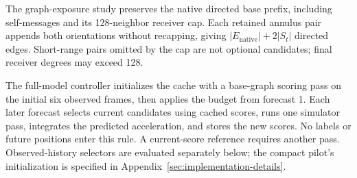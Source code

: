 The graph-exposure study preserves the native directed base prefix, including self-messages and its 128-neighbor receiver cap. Each retained annulus pair appends both orientations without recapping, giving $|E_{\mathrm{native}}|+2|S_t|$ directed edges. Short-range pairs omitted by the cap are not optional candidates; final receiver degrees may exceed 128.

The full-model controller initializes the cache with a base-graph scoring pass on the initial six observed frames, then applies the budget from forecast 1. Each later forecast selects current candidates using cached scores, runs one simulator pass, integrates the predicted acceleration, and stores the new scores. No labels or future positions enter this rule. A current-score reference requires another pass. Observed-history selectors are evaluated separately below; the compact pilot's initialization is specified in Appendix~\ref{sec:implementation-details}.


